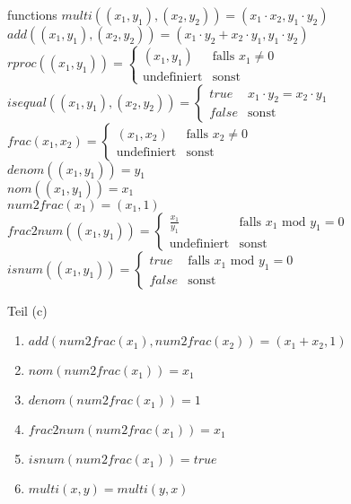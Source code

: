 \documentclass[12pt, twoside]{article}
\begin{document}
\begin{tabbing}
functions   \> $multi((x_1, y_1), (x_2, y_2)) = (x_1 \cdot x_2, y_1 \cdot y_2)$                 \\
            \> $add((x_1, y_1), (x_2, y_2)) = (x_1 \cdot y_2 + x_2 \cdot y_1, y_1 \cdot y_2)$   \\
            \> $rproc((x_1, y_1))=\begin{cases}
            (x_1, y_1) & \text{falls } x_1 \not = 0 \\
            \text{undefiniert} & \text{sonst}            
            \end{cases}$ \\
            \> $isequal((x_1, y_1), (x_2, y_2)) = 
            \begin{cases}
            true & x_1 \cdot y_2 = x_2 \cdot y_1 \\
            false & \text{sonst}
            \end{cases}$ \\
            \> $frac(x_1, x_2) = \begin{cases}
            (x_1, x_2) & \text{falls } x_2 \not = 0 \\
            \text{undefiniert} & \text{sonst}
            \end{cases}$ \\
            \> $denom((x_1, y_1)) = y_1$ \\
            \> $nom((x_1, y_1)) = x_1$ \\
            \> $num2frac(x_1) = (x_1, 1)$ \\
            \> $frac2num((x_1, y_1)) = \begin{cases}
            \frac{x_1}{y_1} & \text{falls }  x_1  \text{ mod }  y_1 = 0 \\
            \text{undefiniert}     & \text{sonst}
            \end{cases}$ \\
            \> $isnum((x_1, y_1)) = \begin{cases}
            true & \text{falls } x_1 \text{ mod } y_1 = 0 \\
            false & \text{sonst}
            \end{cases}
            $ 
 \end{tabbing}

 Teil (c)
\begin{enumerate}
\item $add(num2frac(x_1), num2frac(x_2)) = (x_1+x_2, 1)$ 
\item $nom(num2frac(x_1)) = x_1$ 
\item $denom(num2frac(x_1)) = 1$
\item $frac2num(num2frac(x_1)) = x_1$
\item $isnum(num2frac(x_1)) = true$
\item $multi(x, y) = multi(y, x)$
\end{enumerate}
\end{document}
